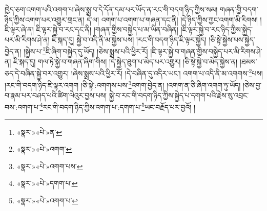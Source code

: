 ཁྱེད་ཅག་འགག་པའི་འགག་པ་ཞེས་སྨྲ་བ་དེ་དོན་དམ་པར་ཡོད་ན་རང་གི་བདག་ཉིད་ཀྱིས་སམ། གཞན་གྱི་བདག་ཉིད་ཀྱིས་འགག་པར་འགྱུར་གྲང་ན། དེ་ལ། འགག་པ་འགག་པ་གཞན་དང་ནི། །དེ་ཉིད་ཀྱིས་ཀྱང་འགག་མི་རིགས། །ཇི་ལྟར་ཞེ་ན། ཇི་ལྟར་སྐྱེ་བ་རང་དང་ནི། །གཞན་གྱིས་བསྐྱེད་པ་མ་ཡིན་བཞིན། །ཇི་ལྟར་སྐྱེ་བ་རང་ཉིད་ཀྱིས་སྐྱེད་པར་མི་རིགས་ཤེ་ན། ཇི་སྐད་དུ། སྐྱེ་བ་འདི་ནི་མ་སྐྱེས་པས། །རང་གི་བདག་ཉིད་ཇི་ལྟར་སྐྱེད། །ཅི་སྟེ་སྐྱེས་པས་སྐྱེད་བྱེད་ན། །སྐྱེས་པ་\footnote{«སྣར་»«པེ་»ན་}ཇི་ཞིག་བསྐྱེད་དུ་ཡོད། །ཅེས་སྨྲས་པའི་ཕྱིར་རོ། །ཇི་ལྟར་སྐྱེ་བ་གཞན་གྱིས་བསྐྱེད་པར་མི་རིགས་ཤེ་ན། ཇི་སྐད་དུ། གལ་ཏེ་སྐྱེ་བ་གཞན་ཞིག་གིས། །དེ་སྐྱེད་ཐུག་པ་མེད་པར་འགྱུར། །ཅི་སྟེ་སྐྱེ་བ་མེད་སྐྱེས་ན། །ཐམས་ཅད་དེ་བཞིན་སྐྱེ་བར་འགྱུར། །ཞེས་སྨྲས་པའི་ཕྱིར་རོ། །དེ་བཞིན་དུ་འདིར་ཡང་། འགག་པ་འདི་ནི་མ་འགགས་\footnote{«སྣར་»«པེ་»འགག་}པས། །རང་གི་བདག་ཉིད་ཇི་ལྟར་འགག །ཅི་སྟེ་:འགགས་པས་\footnote{«སྣར་»«པེ་»འགག་པས་}འགག་བྱེད་ན། །འགག་ན་ཅི་ཞིག་འགག་ཏུ་ཡོད། །ཅེས་བྱ་བ་རྣམ་པར་བཤད་པའི་ཚིག་ལེའུར་བྱས་པས། སྐྱེ་བ་རང་གི་བདག་ཉིད་ཀྱིས་སྐྱེད་པ་དགག་པའི་རྗེས་སུ་འབྲང་བས་:འགག་པ་\footnote{«སྣར་»«པེ་»དགག་པ་}རང་གི་བདག་ཉིད་ཀྱིས་འགག་པ་:དགག་པ་\footnote{«སྣར་»«པེ་»འགག་པ་}ཡང་བརྗོད་པར་བྱའོ། །
